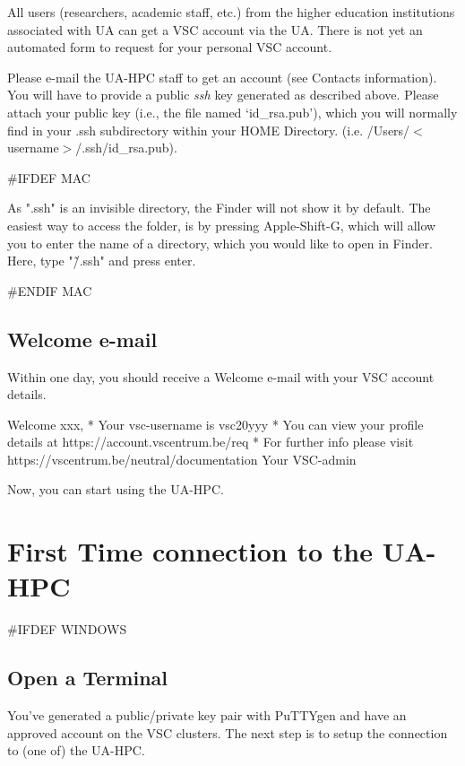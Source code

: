All users (researchers, academic staff, etc.) from the higher education institutions associated with UA can get a VSC account via the UA. There is not yet an automated form to request for your personal VSC account.

Please e-mail the UA-HPC staff to get an account (see Contacts information). You will have to provide a public \textit{ssh} key generated as described above. Please attach your public key (i.e., the file named `id\_rsa.pub'), which you will normally find in your .ssh subdirectory within your HOME Directory. (i.e. /Users/$<$username$>$/.ssh/id\_rsa.pub).


\#IFDEF MAC

\textbf{} As ".ssh" is an invisible directory, the Finder will not show it by default. The easiest way to access the folder, is by pressing Apple-Shift-G, which will allow you to enter the name of a directory, which you would like to open in Finder. Here, type "\~/.ssh" and press enter.

\#ENDIF MAC


\subsection{Welcome e-mail}

Within one day, you should receive a Welcome e-mail with your VSC account details.



Welcome xxx,
* Your vsc-username is vsc20yyy
* You can view your profile details at https://account.vscentrum.be/req
* For further info please visit https://vscentrum.be/neutral/documentation
Your VSC-admin

Now, you can start using the UA-HPC.


\section{First Time connection to the UA-HPC}



\#IFDEF WINDOWS


\subsection{Open a Terminal}

You've generated a public/private key pair with PuTTYgen and have an approved account on the VSC clusters.  The next step is to setup the connection to (one of) the UA-HPC.



